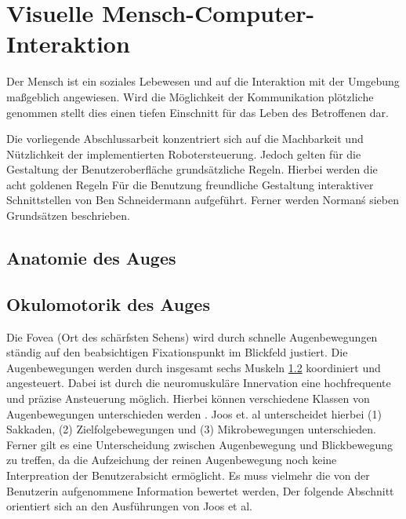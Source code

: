 \section{Visuelle Mensch-Computer-Interaktion}
\label{section:informationstransfer}

Der Mensch ist ein soziales Lebewesen und auf die Interaktion mit der Umgebung maßgeblich angewiesen. Wird die Möglichkeit der Kommunikation plötzliche genommen stellt dies einen tiefen Einschnitt für das Leben des Betroffenen dar. 

Die vorliegende Abschlussarbeit konzentriert sich auf die Machbarkeit und Nützlichkeit der implementierten Robotersteuerung. Jedoch gelten für die Gestaltung der Benutzeroberfläche grundsätzliche Regeln. Hierbei werden die acht goldenen Regeln Für die Benutzung freundliche Gestaltung interaktiver Schnittstellen von Ben Schneidermann aufgeführt. Ferner werden Norman\'s sieben Grundsätzen beschrieben.






\subsection{Anatomie des Auges}
\subsection{Okulomotorik des Auges}


Die Fovea (Ort des schärfsten Sehens) wird durch schnelle Augenbewegungen ständig auf den beabsichtigen Fixationspunkt im Blickfeld justiert. Die Augenbewegungen werden durch insgesamt sechs Muskeln \ref{} koordiniert und angesteuert. Dabei ist durch die neuromuskuläre Innervation eine hochfrequente und präzise Ansteuerung möglich. Hierbei können verschiedene Klassen von Augenbewegungen unterschieden werden \cite{Joos2003}.  
Joos et. al unterscheidet hierbei (1) Sakkaden, (2) Zielfolgebewegungen und (3) Mikrobewegungen unterschieden. 
Ferner gilt es eine Unterscheidung zwischen Augenbewegung und Blickbewegung zu treffen, da die Aufzeichung der reinen Augenbewegung noch keine Interpreation der Benutzerabsicht ermöglicht. Es muss vielmehr die von der Benutzerin aufgenommene Information bewertet werden,  Der folgende Abschnitt orientiert sich an den Ausführungen von Joos et al. 


